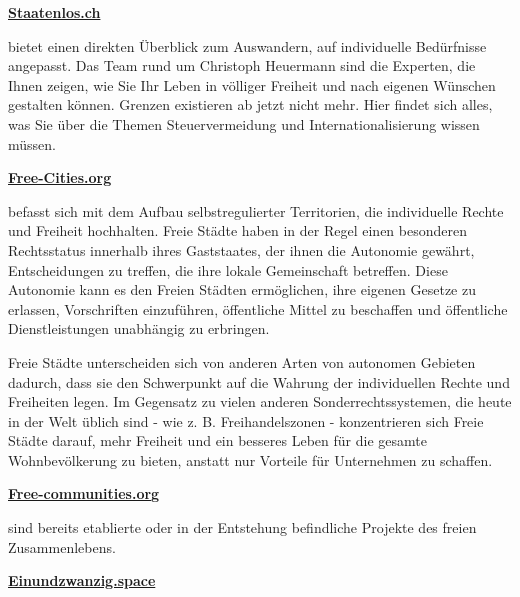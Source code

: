 \documentclass[
  a5paper,
  smalldemyvopaper,10pt,twoside,onecolumn,openright,extrafontsizes,hidelinks]{memoir}
\begin{document}
\vspace{1em}

\href{https://Staatenlos.ch}{\textbf{Staatenlos.ch}}

\vspace{1em}

bietet einen direkten Überblick zum Auswandern, auf individuelle
Bedürfnisse angepasst. Das Team rund um Christoph Heuermann sind die
Experten, die Ihnen zeigen, wie Sie Ihr Leben in völliger Freiheit und
nach eigenen Wünschen gestalten können. Grenzen existieren ab jetzt
nicht mehr. Hier findet sich alles, was Sie über die Themen
Steuervermeidung und Internationalisierung wissen müssen.

\vspace{1em}

\href{https://Free-Cities.org}{\textbf{Free-Cities.org}}

\vspace{1em}

befasst sich mit dem Aufbau selbstregulierter Territorien, die
individuelle Rechte und Freiheit hochhalten. Freie Städte haben in der
Regel einen besonderen Rechtsstatus innerhalb ihres Gaststaates, der
ihnen die Autonomie gewährt, Entscheidungen zu treffen, die ihre lokale
Gemeinschaft betreffen. Diese Autonomie kann es den Freien Städten
ermöglichen, ihre eigenen Gesetze zu erlassen, Vorschriften einzuführen,
öffentliche Mittel zu beschaffen und öffentliche Dienstleistungen
unabhängig zu erbringen.

Freie Städte unterscheiden sich von anderen Arten von autonomen Gebieten
dadurch, dass sie den Schwerpunkt auf die Wahrung der individuellen
Rechte und Freiheiten legen. Im Gegensatz zu vielen anderen
Sonderrechtssystemen, die heute in der Welt üblich sind - wie z. B.
Freihandelszonen - konzentrieren sich Freie Städte darauf, mehr Freiheit
und ein besseres Leben für die gesamte Wohnbevölkerung zu bieten,
anstatt nur Vorteile für Unternehmen zu schaffen.

\vspace{1em}

\href{https://Free-communities.org}{\textbf{Free-communities.org}}

\vspace{1em}

sind bereits etablierte oder in der Entstehung befindliche Projekte des
freien Zusammenlebens.

\vspace{1em}

\href{https://Einundzwanzig.space}{\textbf{Einundzwanzig.space}}
\end{document}
